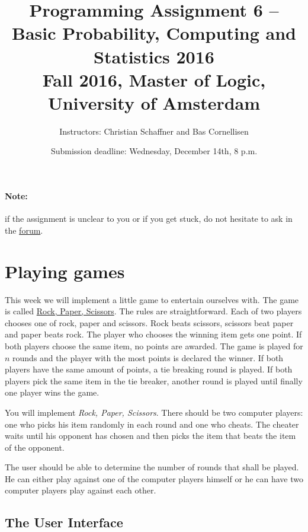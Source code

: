 \documentclass[11pt, leqno, a4paper]{article}
\title{Programming Assignment 6 -- Basic Probability, Computing and Statistics 2016 \\[2mm]
\large{Fall 2016, Master of Logic, University of Amsterdam}}
\author{Instructors: Christian Schaffner and Bas Cornellisen}
\date{Submission deadline: Wednesday, December 14th, 8 p.m.}
\begin{document}
\maketitle

\paragraph{Note:} if the assignment is unclear to you or if you get
stuck, do not hesitate to ask in the
\href{https://www.moodle.ch/lms/mod/forum/view.php?id=1721}{forum}.

\section{Playing games}\label{intro}
This week we will implement a little game to entertain ourselves with. The game is called \href{https://en.wikipedia.org/wiki/Rock-paper-scissors}{Rock, Paper, Scissors}. 
The rules are straightforward.
Each of two players chooses one of rock, paper and scissors. Rock beats scissors, scissors beat paper and paper beats rock. The player who chooses the winning
item gets one point. If both players choose the same item, no points are awarded. The game is played for $ n $ rounds and the player with the most points
is declared the winner. If both players have the same amount of points, a tie breaking round is played. If both players pick the same item in the tie breaker,
another round is played until finally one player wins the game.

You will implement \textit{Rock, Paper, Scissors}. There should be two computer players: one who picks his item randomly in each round and one who cheats. 
The cheater waits until his opponent has chosen and then picks the item that beats the item of the
opponent.

The user should be able to determine the number of rounds that shall be played. He can either play against one of the computer players himself or he can have two
computer players play against each other.

\subsection{The User Interface}\label{sec:interface}
\end{document}
